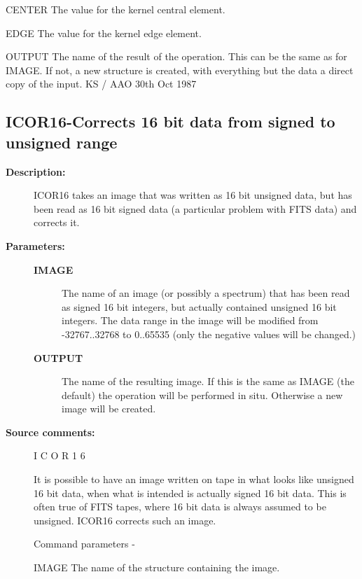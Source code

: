 \begin{description}
\begin{description}
\begin{terminalv}
 CENTER   The value for the kernel central element.

 EDGE     The value for the kernel edge element.

 OUTPUT   The name of the result of the operation.  This can
          be the same as for IMAGE.  If not, a new structure
          is created, with everything but the data a direct
          copy of the input.
                                  KS / AAO 30th Oct 1987
\end{terminalv}
\end{description}
\subsection{ICOR16-\label{ICOR16}Corrects 16 bit data from signed to unsigned range}
\begin{description}

\item [\textbf{Description:}]
 ICOR16 takes an image that was written as 16 bit unsigned data, but
 has been read as 16 bit signed data (a particular problem with FITS
 data) and corrects it.

\item [\textbf{Parameters:}]
\begin{description}
\item [\textbf{IMAGE}]
 The name of an image (or possibly a spectrum) that
 has been read as signed 16 bit integers, but actually
 contained unsigned 16 bit integers.  The data range
 in the image will be modified from -32767..32768 to
 0..65535 (only the negative values will be changed.)
\item [\textbf{OUTPUT}]
 The name of the resulting image.  If this is
 the same as IMAGE (the default) the operation
 will be performed in situ.  Otherwise a new
 image will be created.
\end{description}

\item [\textbf{Source comments:}]
\begin{terminalv}
 I C O R 1 6

 It is possible to have an image written on tape in what looks
 like unsigned 16 bit data, when what is intended is actually
 signed 16 bit data.  This is often true of FITS tapes, where
 16 bit data is always assumed to be unsigned.  ICOR16 corrects
 such an image.

 Command parameters -

 IMAGE  The name of the structure containing the image.


\end{terminalv}
\end{description}
\end{description}
